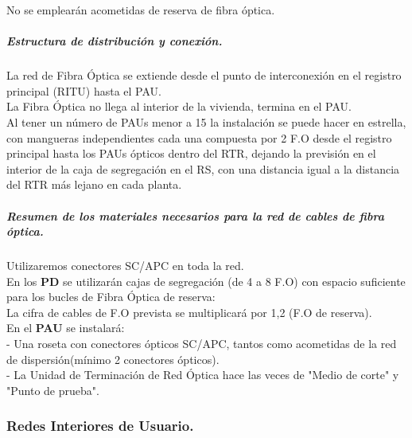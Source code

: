 No se emplearán acometidas de reserva de fibra óptica.
\subparagraph{Estructura de distribución y conexión.}
La red de Fibra Óptica se extiende desde el punto de interconexión en el registro principal (RITU) hasta el PAU.\\
La Fibra Óptica no llega al interior de la vivienda, termina en el PAU.\\
Al tener un número de PAUs menor a 15 la instalación se puede hacer en estrella, con  mangueras independientes  cada una compuesta por 2 F.O desde el registro principal hasta los PAUs ópticos dentro del RTR, dejando la previsión en el interior de la caja de segregación en el RS, con una distancia igual a la distancia del RTR más lejano en cada planta.\\
\subparagraph{Resumen de los materiales necesarios para la red de cables de fibra óptica.}
Utilizaremos conectores SC/APC en toda la red.\\
En los \textbf{PD} se utilizarán cajas de segregación (de 4 a 8 F.O) con espacio suficiente para los bucles de Fibra Óptica de reserva:\\ 
La cifra de cables de F.O prevista se multiplicará por 1,2 (F.O de reserva).\\
En el \textbf{PAU} se instalará:\\
	- Una roseta con conectores ópticos SC/APC, tantos como acometidas de la red de dispersión(mínimo 2 conectores ópticos).\\
	- La Unidad de Terminación de Red Óptica hace las veces de "Medio de corte" y "Punto de prueba".\\
\subsubsection{Redes Interiores de Usuario.}
